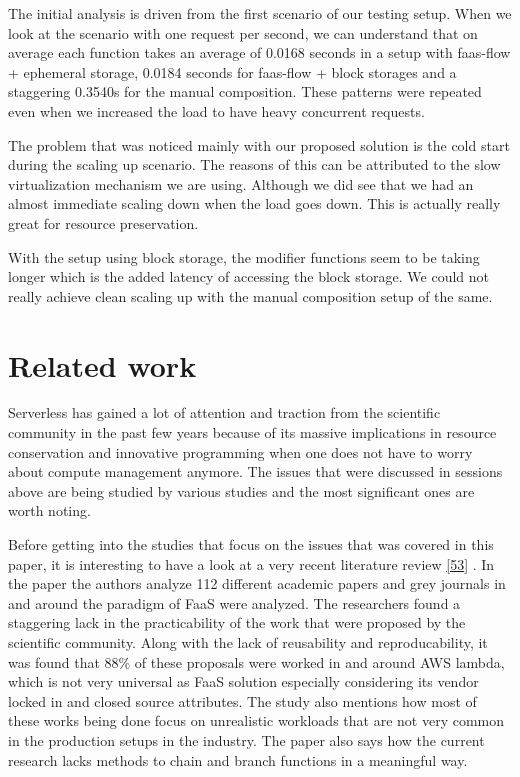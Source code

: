 \documentclass[12pt,titlepage]{article}
\begin{document}
The initial analysis is driven from the first scenario of our testing setup.
When we look at the scenario with one request per second, we can understand that
on average each function takes an average of 0.0168 seconds in a setup with
faas-flow + ephemeral storage, 0.0184 seconds for faas-flow + block storages and
a staggering 0.3540s for the manual composition. These patterns were repeated
even when we increased the load to have heavy concurrent requests.

The problem that was noticed mainly with our proposed solution is the cold start
during the scaling up scenario. The reasons of this can be attributed to the
slow virtualization mechanism we are using. Although we did see that we had an
almost immediate scaling down when the load goes down. This is actually really
great for resource preservation.

With the setup using block storage, the modifier functions seem to be taking
longer which is the added latency of accessing the block storage. We could not
really achieve clean scaling up with the manual composition setup of the same.

\section{Related work}
\label{sec:org771b18b}
Serverless has gained a lot of attention and traction from the scientific
community in the past few years because of its massive implications in resource
conservation and innovative programming when one does not have to worry about
compute management anymore. The issues that were discussed in sessions above are
being studied by various studies and the most significant ones are worth noting.

Before getting into the studies that focus on the issues that was covered in
this paper, it is interesting to have a look at  a very recent literature review \hyperref[ref:53]{[53}]
. In the paper the authors analyze 112 different academic papers
and grey journals in
and around the paradigm of FaaS were analyzed. The researchers found a
staggering lack in the practicability of the work that were proposed by the
scientific community. Along with the lack of reusability and reproducability, it
was found that 88\% of these proposals were worked in and around AWS lambda,
which is not very universal as FaaS solution especially considering its vendor
locked in and closed source attributes. The study also mentions how most of
these works being done focus on unrealistic workloads that are not very common
in the production setups in the industry. The paper also says how the current
research lacks methods to chain and branch functions in a meaningful way.
\end{document}
